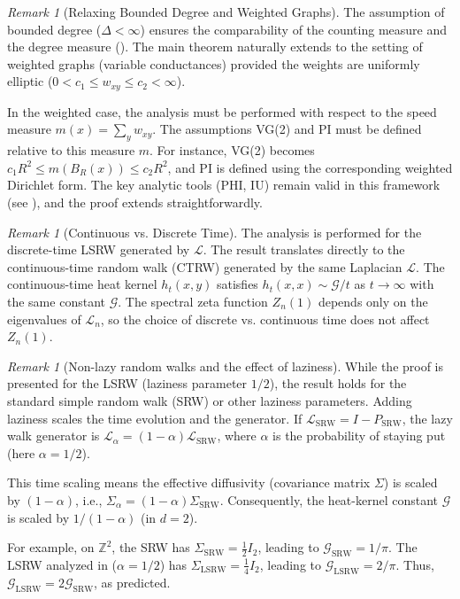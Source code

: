 \documentclass{article}
\numberwithin{equation}{section}
\theoremstyle{definition}
\theoremstyle{remark}
\newtheorem{remark}[theorem]{Remark}
\newcommand{\cG}{\mathcal{G}}
\newcommand{\LL}{\mathcal{L}}
\begin{document}
\begin{remark}[Relaxing Bounded Degree and Weighted Graphs]\label{rem:weighted}
The assumption of bounded degree ($\Delta < \infty$) ensures the comparability of the counting measure and the degree measure (). The main theorem naturally extends to the setting of weighted graphs (variable conductances) provided the weights are uniformly elliptic ($0 < c_1 \leq w_{xy} \leq c_2 < \infty$).

In the weighted case, the analysis must be performed with respect to the speed measure $m(x)=\sum_{y} w_{xy}$. The assumptions VG(2) and PI must be defined relative to this measure $m$. For instance, VG(2) becomes $c_1 R^2 \leq m(B_R(x)) \leq c_2 R^2$, and PI is defined using the corresponding weighted Dirichlet form. The key analytic tools (PHI, IU) remain valid in this framework (see \cite{Delmotte99}), and the proof extends straightforwardly.
\end{remark}

\begin{remark}[Continuous vs. Discrete Time]\label{rem:continuous_time}
The analysis is performed for the discrete-time LSRW generated by $\LL$. The result translates directly to the continuous-time random walk (CTRW) generated by the same Laplacian $\LL$. The continuous-time heat kernel $h_t(x,y)$ satisfies $h_t(x,x) \sim \cG/t$ as $t\to\infty$ with the same constant $\cG$. The spectral zeta function $Z_n(1)$ depends only on the eigenvalues of $\LL_n$, so the choice of discrete vs. continuous time does not affect $Z_n(1)$.
\end{remark}

\begin{remark}[Non-lazy random walks and the effect of laziness]\label{rem:non-lazy}
While the proof is presented for the LSRW (laziness parameter $1/2$), the result holds for the standard simple random walk (SRW) or other laziness parameters. Adding laziness scales the time evolution and the generator. If $\LL_{\text{SRW}} = I - P_{\text{SRW}}$, the lazy walk generator is $\LL_{\alpha} = (1-\alpha)\LL_{\text{SRW}}$, where $\alpha$ is the probability of staying put (here $\alpha=1/2$).

This time scaling means the effective diffusivity (covariance matrix $\Sigma$) is scaled by $(1-\alpha)$, i.e., $\Sigma_{\alpha} = (1-\alpha)\Sigma_{\text{SRW}}$. Consequently, the heat-kernel constant $\cG$ is scaled by $1/(1-\alpha)$ (in $d=2$).

For example, on $\mathbb{Z}^2$, the SRW has $\Sigma_{\text{SRW}} = \frac{1}{2} I_2$, leading to $\cG_{\text{SRW}} = 1/\pi$. The LSRW analyzed in  ($\alpha=1/2$) has $\Sigma_{\text{LSRW}} = \frac{1}{4} I_2$, leading to $\cG_{\text{LSRW}} = 2/\pi$. Thus, $\cG_{\text{LSRW}}=2\cG_{\text{SRW}}$, as predicted.
\end{remark}
\end{document}
